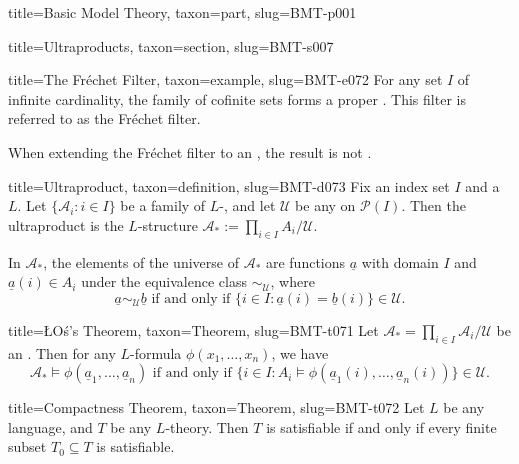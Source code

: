 \documentclass[a4paper]{article}
\begin{document}
\begin{tree}{title={Basic Model Theory}, taxon={part}, slug={BMT-p001}}
\begin{tree}{title={Ultraproducts}, taxon={section}, slug={BMT-s007}}
\begin{tree}{title={The Fréchet Filter}, taxon={example}, slug={BMT-e072}}
For any set \(I\) of infinite cardinality, the family of cofinite sets forms a proper . This filter is referred to as the Fréchet filter.\par{When extending the Fréchet filter to an , the result is not .}
\end{tree}

\begin{tree}{title={Ultraproduct}, taxon={definition}, slug={BMT-d073}}
Fix an index set \(I\) and a  \(L\). Let \(\{ \mathcal {A}_i: i \in  I \}\) be a family of \(L\)-, and let \(\mathcal {U}\) be any  on \(\mathcal {P}(I)\). Then the ultraproduct is the \(L\)-structure \(\mathcal {A}_* :=  \prod _{i \in  I} A_i / \mathcal {U}\). \par{In \(\mathcal {A}_*\), the elements of the universe of \(\mathcal {A}_*\) are functions \(\underline {a}\) with domain \(I\) and \(\underline {a}(i) \in  A_i\) under the equivalence class \(\sim _{ \mathcal {U}}\), where \[\underline {a} \sim _{ \mathcal {U}} \underline {b}  \text { if and only if } \{ i \in  I:  \underline {a}(i)= \underline {b}(i) \}   \in   \mathcal {U}.\]}
\end{tree}

\begin{tree}{title={ŁOś's Theorem}, taxon={Theorem}, slug={BMT-t071}}
Let \(\mathcal {A}_* =  \prod \limits _{i \in  I}  \mathcal {A}_i /  \mathcal {U}\) be an . Then for any \(L\)-formula \(\phi (x_1, \dots ,x_n)\), we have \[\mathcal {A}_* \models   \phi ( \underline {a}_1, \dots , \underline {a}_n)  \text { if and only if }  \{ i \in  I: A_i \models \phi ( \underline {a}_1(i), \dots ,  \underline {a}_n(i)) \} \in \mathcal {U}.\]
\end{tree}

\begin{tree}{title={Compactness Theorem}, taxon={Theorem}, slug={BMT-t072}}
Let \(L\) be any language, and \(T\) be any \(L\)-theory. Then \(T\) is satisfiable if and only if every finite subset \(T_0 \subseteq  T\) is satisfiable.
\end{tree}

\end{tree}



\end{tree}
\end{document}
